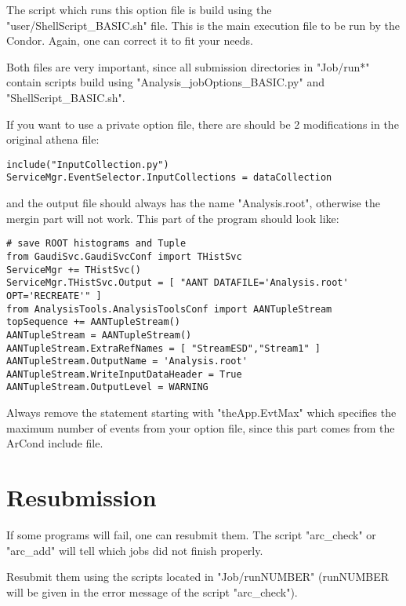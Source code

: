 \documentclass[a4paper]{book}
\begin{document}
The script which runs this option file is build using the "user/ShellScript\_BASIC.sh" file.
This is the main execution file to be run by the Condor.
Again, one can correct it to fit your needs.

Both files are very important, since all submission directories in "Job/run*"
contain scripts build using "Analysis\_jobOptions\_BASIC.py" and "ShellScript\_BASIC.sh".

If you want to use a private option file, there are should be 2 modifications in the original athena file:


\begin{verbatim}
include("InputCollection.py")
ServiceMgr.EventSelector.InputCollections = dataCollection
\end{verbatim}

and the output file should always has the name "Analysis.root", otherwise the mergin
part will not work. This part of the  program should look like:

\begin{verbatim}
# save ROOT histograms and Tuple
from GaudiSvc.GaudiSvcConf import THistSvc
ServiceMgr += THistSvc()
ServiceMgr.THistSvc.Output = [ "AANT DATAFILE='Analysis.root' OPT='RECREATE'" ]
from AnalysisTools.AnalysisToolsConf import AANTupleStream
topSequence += AANTupleStream()
AANTupleStream = AANTupleStream()
AANTupleStream.ExtraRefNames = [ "StreamESD","Stream1" ]
AANTupleStream.OutputName = 'Analysis.root'
AANTupleStream.WriteInputDataHeader = True
AANTupleStream.OutputLevel = WARNING
\end{verbatim}

Always remove the statement starting with "theApp.EvtMax"  which specifies 
the maximum number of events from your option file, since this
part comes from the ArCond include file.


\section{Resubmission}

If some programs will fail, one can resubmit them. The script "arc\_check" or  "arc\_add"
will tell which jobs did not finish properly.

Resubmit them using the scripts located in "Job/runNUMBER" (runNUMBER will be given in the error
message of the script "arc\_check").
 




\end{document}
